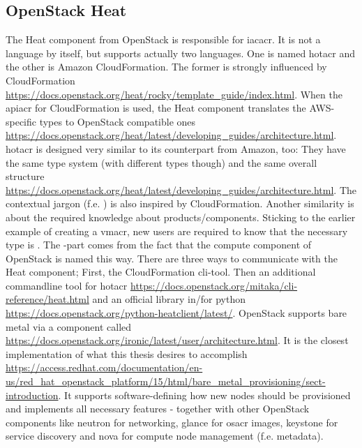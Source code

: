 \subsection{OpenStack Heat}
The Heat component from OpenStack is responsible for \gls{iacacr}. It is not a language by itself, but supports actually two languages. One is named \gls{hotacr} and the other is Amazon CloudFormation. The former is strongly influenced by CloudFormation \url{https://docs.openstack.org/heat/rocky/template_guide/index.html}. When the \gls{apiacr} for CloudFormation is used, the Heat component translates the AWS-specific types to OpenStack compatible ones \url{https://docs.openstack.org/heat/latest/developing_guides/architecture.html}.
\newline
\Gls{hotacr} is designed very similar to its counterpart from Amazon, too: They have the same type system (with different types though) and the same overall structure \url{https://docs.openstack.org/heat/latest/developing_guides/architecture.html}. The contextual jargon (f.e. ) is also inspired by CloudFormation.
\newline
Another similarity is about the required knowledge about products/components. Sticking to the earlier example of creating a \gls{vmacr}, new users are required to know that the necessary type is . The -part comes from the fact that the compute component of OpenStack is named this way.
\newline
There are three ways to communicate with the Heat component; First, the CloudFormation cli-tool. Then an additional commandline tool for \gls{hotacr} \url{https://docs.openstack.org/mitaka/cli-reference/heat.html} and an official library in/for python \url{https://docs.openstack.org/python-heatclient/latest/}.
\newline
OpenStack supports bare metal via a component called  \url{https://docs.openstack.org/ironic/latest/user/architecture.html}. It is the closest implementation of what this thesis desires to accomplish \url{https://access.redhat.com/documentation/en-us/red_hat_openstack_platform/15/html/bare_metal_provisioning/sect-introduction}. It supports software-defining how new nodes should be provisioned and implements all necessary features - together with other OpenStack components like neutron for networking, glance for \gls{osacr} images, keystone for service discovery and nova for compute node management (f.e. metadata).

